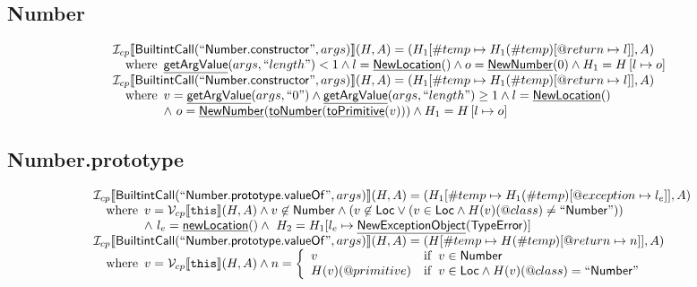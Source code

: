 \documentclass{article}
\newcommand{\SF}[1]{\mbox{\textsf{#1}}}
\newcommand{\TT}[1]{\mbox{\texttt{#1}}}
\newcommand{\wherec}[1]{{\rm where}\begin{array}[t]{l}#1\end{array}}
\newcommand{\ifc}[1]{{\rm if}\begin{array}[t]{l}#1\end{array}}
\newcommand{\I}{\mathcal{I}}
\newcommand{\V}{\mathcal{V}}
\newcommand{\lbr}{\llbracket}
\newcommand{\rbr}{\rrbracket}
\newcommand{\hf}[1]{\underline{\sf #1}}
\begin{document}
\subsection{Number}
\[
\begin{array}{l}
\I _{cp}\lbr \SF{BuiltintCall}(``\SF{Number.constructor}",args)\rbr(H,A)
  = (H_1[\#temp \mapsto H_1(\#temp)[@return \mapsto l]], A)\\
\quad\wherec{
  \hf{getArgValue}(args, ``length") < 1 
  \land l=\hf{NewLocation}() \land o=\hf{NewNumber}(0) \land H_1=H\left[l\mapsto o\right]
  }\\
  
\I _{cp}\lbr \SF{BuiltintCall}(``\SF{Number.constructor}",args)\rbr(H,A)
  = (H_1[\#temp \mapsto H_1(\#temp)[@return \mapsto l]], A)\\
\quad\wherec{
  v = \hf{getArgValue}(args, ``0") \land \hf{getArgValue}(args, ``length") \geq 1
  \land l=\hf{NewLocation}()\\
  \land\ o=\hf{NewNumber}(\hf{toNumber}(\hf{toPrimitive}(v))) \land H_1=H\left[l\mapsto o\right]
  }\\

\end{array}
\]


\subsection{Number.prototype}
\[
\begin{array}{l}
\I _{cp}\lbr \SF{BuiltintCall}(``\SF{Number.prototype.valueOf}",args)\rbr(H,A)
  = (H_1[\#temp \mapsto H_1(\#temp)[@exception \mapsto l_e]], A)\\
\quad\wherec{
  v = \V _{cp}\lbr \TT{this}\rbr (H,A) \land v \not\in \SF{Number} \land
  (v \not\in \SF{Loc} \lor (v \in \SF{Loc} \land H(v)(@class) \neq ``\SF{Number}"))\\
  \land\ l_e = \hf{newLocation}() \land\ H_2=H_1[l_e\mapsto\hf{NewExceptionObject}(\SF{TypeError})] 
  }\\

\I _{cp}\lbr \SF{BuiltintCall}(``\SF{Number.prototype.valueOf}",args)\rbr(H,A)
  = (H[\#temp \mapsto H(\#temp)[@return \mapsto n]], A)\\
\quad\wherec{
  v = \V _{cp}\lbr \TT{this}\rbr (H,A)
  \land n = \left\{
    \begin{array}{ll}
      v & \ifc{v \in \SF{Number}}\\
      H(v)(@primitive) & \ifc{v \in \SF{Loc} \land H(v)(@class) = ``\SF{Number}"}
    \end{array}\right.
  }\\
\\\\
\end{array}
\]
\end{document}
